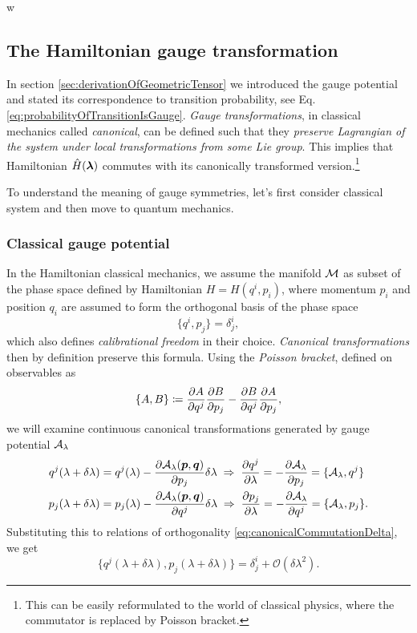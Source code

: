 w




\subsection{The Hamiltonian gauge transformation}
In section \ref{sec:derivationOfGeometricTensor} we introduced the gauge potential and stated its correspondence to transition probability, see Eq. \ref{eq:probabilityOfTransitionIsGauge}.
\emph{Gauge transformations}, in classical mechanics called \emph{canonical}, can be defined such that they \emph{preserve Lagrangian of the system under local transformations from some Lie group}. This implies that Hamiltonian $\hat{H}({\bm\lambda})$ commutes with its canonically transformed version.\footnote{This can be easily reformulated to the world of classical physics, where the commutator is replaced by Poisson bracket.}

To understand the meaning of gauge symmetries, let's first consider classical system and then move to quantum mechanics.




\subsubsection{Classical gauge potential}
In the Hamiltonian classical mechanics, we assume the manifold $\mathcal{M}$ as subset of the phase space defined by Hamiltonian $H=H(q^i,p_i)$, where momentum $p_i$ and position $q_i$ are assumed to form the orthogonal basis of the phase space
\begin{equation}
    \{q^i,p_j\}=\delta^i_j,
    \label{eq:canonicalCommutationDelta}
\end{equation}
which also defines \emph{calibrational freedom} in their choice. \emph{Canonical transformations} then by definition preserve this formula. Using the \emph{Poisson bracket}, defined on observables as
\begin{equation}
    \{A,B\}\coloneqq \frac{\partial A}{\partial q^j}\frac{\partial B}{\partial p_j}-\frac{\partial B}{\partial q^j}\frac{\partial A}{\partial p_j},
\end{equation}
we will examine continuous canonical transformations generated by gauge potential $\mathcal{A}_\lambda$
\begin{align}
        q^j(\lambda+\delta\lambda)&=q^j(\lambda)-\frac{\partial \mathcal{A}_\lambda(\bm{p},\bm{q})}{\partial p_j}\delta\lambda \;\Rightarrow\; \frac{\partial q^j}{\partial \lambda}=-\frac{\partial \mathcal{A}_\lambda}{\partial p_j}=\{\mathcal{A}_\lambda,q^j\}
        \label{eq:gaugeAsGeneratorOfMotion1}\\
        p_j(\lambda+\delta\lambda)&=p_j(\lambda)-\frac{\partial \mathcal{A}_\lambda(\bm{p},\bm{q})}{\partial q^j}\delta\lambda \;\Rightarrow\; \frac{\partial p_j}{\partial \lambda}=-\frac{\partial \mathcal{A}_\lambda}{\partial q^j}=\{\mathcal{A}_\lambda,p_j\}.
        \label{eq:gaugeAsGeneratorOfMotion2}
\end{align}
Substituting this to relations of orthogonality \ref{eq:canonicalCommutationDelta}, we get
\begin{equation}
    \{q^j(\lambda+\delta\lambda),p_j(\lambda+\delta\lambda)\}=\delta^i_j + \mathcal{O}(\delta\lambda^2).
\end{equation}
 
